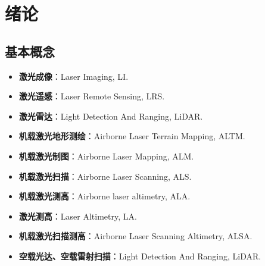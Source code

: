 \chapter{绪论}

\section{基本概念}
\begin{itemize}
    \item \textbf{激光成像}：Laser Imaging, LI.
    \item \textbf{激光遥感}：Laser Remote Sensing, LRS.
    \item \textbf{激光雷达}：Light Detection And Ranging, LiDAR.
    \item \textbf{机载激光地形测绘}：Airborne Laser Terrain Mapping, ALTM.
    \item \textbf{机载激光制图}：Airborne Laser Mapping, ALM.
    \item \textbf{机载激光扫描}：Airborne Laser Scanning, ALS.
    \item \textbf{机载激光测高}：Airborne laser altimetry, ALA.
    \item \textbf{激光测高}：Laser Altimetry, LA.
    \item \textbf{机载激光扫描测高}：Airborne Laser Scanning Altimetry, ALSA.
    \item \textbf{空载光达、空载雷射扫描}：Light Detection And Ranging, LiDAR.
\end{itemize}

